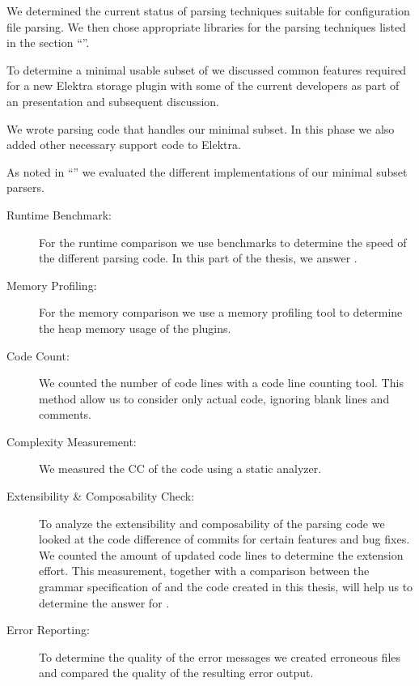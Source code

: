 \begin{description}[style=multiline, leftmargin=3.2cm, font=\bfseries]

  \item[Literature Review] We determined the current status of parsing techniques suitable for configuration file parsing. We then chose appropriate libraries for the parsing techniques listed in the section “”.

  \item[Discussion] To determine a minimal usable subset of  we discussed common features required for a new Elektra storage plugin with some of the current developers as part of an presentation and subsequent discussion.

  \item[Implementation] We wrote parsing code that handles our minimal  subset. In this phase we also added other necessary support code to Elektra.

  \item[Comparison] As noted in “” we evaluated the different implementations of our minimal  subset parsers.

  \begin{description}
    \item[Runtime Benchmark:] For the runtime comparison we use benchmarks to determine the speed of the different parsing code. In this part of the thesis, we answer .

    \item[Memory Profiling:] For the memory comparison we use a memory profiling tool to determine the heap memory usage of the  plugins.

    \item[Code Count:] We counted the number of code lines with a code line counting tool. This method allow us to consider only actual code, ignoring blank lines and comments.

    \item[Complexity Measurement:] We measured the \gls{CC} of the code using a static analyzer.

    \item[Extensibility \& Composability Check:] To analyze the extensibility and composability of the parsing code we looked at the code difference of commits for certain features and bug fixes. We counted the amount of updated code lines to determine the extension effort. This measurement, together with a comparison between the grammar specification of  and the code created in this thesis, will help us to determine the answer for .

    \item[Error Reporting:] To determine the quality of the error messages we created erroneous files and compared the quality of the resulting error output.
  \end{description}

\end{description}
